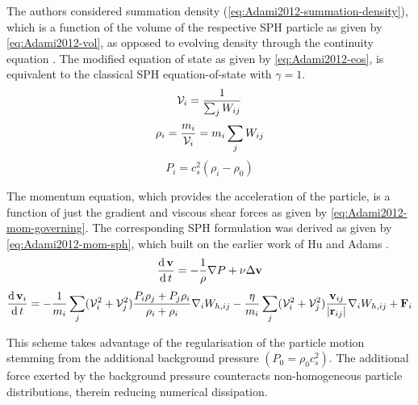 The authors considered summation density (\ref{eq:Adami2012-summation-density}), which is a function of the volume of the respective SPH particle as given by \ref{eq:Adami2012-vol}, as opposed to evolving density through the continuity equation \parencite{hu2006multi}. The modified equation of state as given by \ref{eq:Adami2012-eos}, is equivalent to the classical SPH equation-of-state with $\gamma=1$.
\begin{equation}
    \Vol_i = \frac{1}{\sum_j W_{ij}}
    \label{eq:Adami2012-vol}
\end{equation}
\begin{equation}
    \rho_i = \frac{m_i}{\Vol_i} = m_i\sum_j W_{ij}
    \label{eq:Adami2012-summation-density}
\end{equation}
\begin{equation}
    P_i = c_s^2 (\rho_i - \rho_0)
    \label{eq:Adami2012-eos}
\end{equation}

The momentum equation, which provides the acceleration of the particle, is a function of just the gradient and viscous shear forces as given by \ref{eq:Adami2012-mom-governing}. The corresponding SPH formulation was derived as given by \ref{eq:Adami2012-mom-sph}, which built on the earlier work of Hu and Adams \parencite{hu2007incompressible}.
\begin{equation}
    \LagDerivative{\vect{v}} = -\frac{1}{\rho}\nabla P + \nu \Delta \vect{v} 
    \label{eq:Adami2012-mom-governing}
\end{equation}
\begin{equation}
    \LagDerivative{\vect{v}_i} = -\frac{1}{m_i} \sum_j (\Vol^2_i + \Vol^2_j) \frac{P_i \rho_j + P_j \rho_i}{\rho_i + \rho_i} \DWIJ - \frac{\eta}{m_i} \sum_j (\Vol^2_i + \Vol^2_j) \frac{\VIJ}{\RtwoIJ[]}\DWIJ + \vect{F}_i
    \label{eq:Adami2012-mom-sph}
\end{equation}

This scheme takes advantage of the regularisation of the
particle motion stemming from the additional background pressure $(P_0 = \rho_0 c_s^2)$. The additional force exerted by the background pressure counteracts non-homogeneous particle distributions, therein reducing numerical dissipation.

